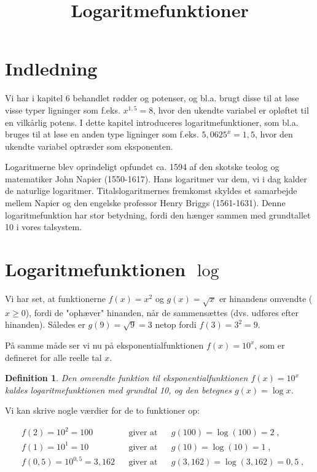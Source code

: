 \documentclass[12pt,oneside,a4paper]{article}
\title{Logaritmefunktioner}
\date{\vspace{-5ex}}
\theoremstyle{plain}
\newtheorem*{mydef}{Definition}
\begin{document}
\maketitle

\section*{Indledning}
Vi har i kapitel 6 behandlet rødder og potenser, og bl.a. brugt disse
til at løse visse typer ligninger som f.eks. $x^{1,5} = 8$, hvor den ukendte
variabel er opløftet til en vilkårlig potens.
I dette kapitel introduceres logaritmefunktioner, som bl.a. bruges
til at løse en anden type ligninger som f.eks. $5,0625^x = 1,5$, hvor den ukendte
variabel optræder som eksponenten.

Logaritmerne blev oprindeligt opfundet ca. 1594 af den skotske teolog og matematiker John
Napier (1550-1617). Hans logaritmer var dem, vi i dag kalder de naturlige
logaritmer. Titalslogaritmernes fremkomst skyldes et samarbejde mellem Napier
og den engelske professor Henry Briggs (1561-1631). Denne logaritmefunktion har
stor betydning, fordi den hænger sammen med grundtallet 10 i vores talsystem.

\section*{Logaritmefunktionen $\log$}
Vi har set, at funktionerne $f(x) = x^2$ og $g(x) = \sqrt{x}$  er hinandens omvendte
($x \geq 0$), fordi de "ophæver" hinanden, når de sammensættes (dvs. udføres
efter hinanden).  Således er $g(9) = \sqrt{9} = 3$ netop fordi $f(3) = 3^2 = 9$.

På samme måde ser vi nu på eksponentialfunktionen $f(x) = 10^x$, som er
defineret for alle reelle tal $x$.

\begin{tcolorbox}
\begin{mydef}
Den omvendte funktion til eksponentialfunktionen $f(x) = 10^x$ kaldes {\em
logaritmefunktionen med grundtal 10}, og den betegnes $g(x) = \log x$.
\end{mydef}
\end{tcolorbox}

Vi kan skrive nogle værdier for de to funktioner op:

\[
\begin{aligned}
    &f(2) = 10^2 = 100 && \text{giver at} && g(100) = \log (100) = 2 \; , \\
    &f(1) = 10^1 = 10 && \text{giver at} && g(10) = \log (10) = 1 \; , \\
    &f(0,5) = 10^{0,5} = 3,162 && \text{giver at} && g(3,162) = \log (3,162) = 0,5 \; ,
\end{aligned}
\]
\end{document}

